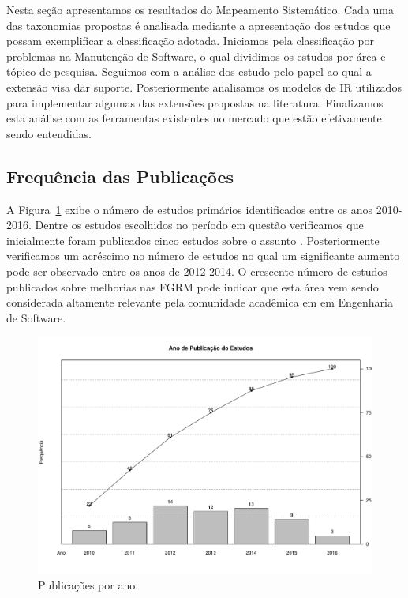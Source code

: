 Nesta seção apresentamos os resultados do Mapeamento Sistemático. Cada uma das
taxonomias propostas é analisada mediante a apresentação dos estudos que possam
exemplificar a classificação adotada.  Iniciamos pela classificação por
problemas na Manutenção de Software, o qual dividimos os estudos por área e
tópico de pesquisa. Seguimos com a análise dos estudo pelo papel ao qual a
extensão visa dar suporte. Posteriormente analisamos os modelos de IR utilizados
para implementar algumas das extensões propostas na literatura. Finalizamos esta
análise com as ferramentas existentes no mercado que estão efetivamente sendo
entendidas.

\subsection{Frequência das Publicações}
\label{sub:frequencia_publicacao}
A Figura~\ref{fig:publicacao_por_ano} exibe o número de estudos primários
identificados entre os anos 2010-2016. Dentre os estudos escolhidos no período
em questão verificamos  que inicialmente foram publicados cinco estudos sobre o
assunto
\cite{sun2010discriminative,gegick2010identifying,song2010jdf,nagwani2010predictive,zimmermann2010makes}.
Posteriormente verificamos um acréscimo no número de estudos no qual um
significante aumento pode ser observado entre os anos de 2012-2014. O crescente
número de estudos publicados sobre melhorias nas FGRM pode indicar que esta área
vem sendo considerada altamente relevante pela comunidade acadêmica em em
Engenharia de Software.

\begin{figure}[htpb]
	\centering
	\includegraphics[width=0.9\linewidth]{chapter-mapeamento-sistematico/img/ano-publicao-estudos.pdf}
	\caption{Publicações por ano.}
	\label{fig:publicacao_por_ano}
\end{figure}

